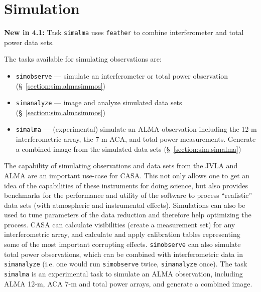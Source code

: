 
\chapter[Simulation]{Simulation}
\label{chapter:sim}

{\bfseries New in 4.1:}
Task {\tt simalma} uses {\tt feather} to combine interferometer and total
power data sets.



The tasks available for simulating observations are:
\begin{itemize}
\item {\tt simobserve} --- simulate an interferometer or total power
observation (\S~\ref{section:sim.almasimmos})
\item {\tt simanalyze} --- image and analyze simulated data sets
(\S~\ref{section:sim.almasimmos})
\item {\tt simalma} --- (experimental) simulate an ALMA observation
including the 12-m interferometric array, the 7-m ACA, and total power
measurements. Generate a combined image from the simulated data sets
(\S~\ref{section:sim.simalma})
\end{itemize}

The capability of simulating observations and data sets from the JVLA
and ALMA are an important use-case for CASA.  This not only allows one
to get an idea of the capabilities of these instruments for doing
science, but also provides benchmarks for the performance and utility
of the software to process ``realistic'' data sets (with
atmospheric and instrumental effects).  Simulations can
also be used to tune parameters of the data reduction and therefore
help optimizing the process.
CASA can calculate
visibilities (create a measurement set) for any interferometric array,
and calculate and apply calibration tables representing some of the
most important corrupting effects. {\tt simobserve} can also simulate
total power observations, which can be combined with interferometric
data in {\tt simanalyze} (i.e. one would run {\tt simobserve} twice,
{\tt simanalyze} once).
The task {\tt simalma} is an experimental task to simulate an ALMA
observation, including ALMA 12-m, ACA 7-m and total power arrays, and
generate a combined image.


